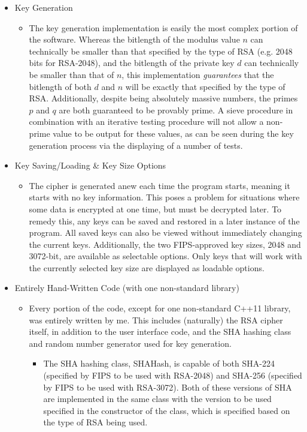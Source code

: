 \documentclass[11pt]{article}
\begin{document}
\begin{itemize}
{\begin{itemize}
{Signing with CRT can be accomplished in the same manner, simply swapping the positions of $m$ and $c$.
	}
	\end{itemize}
}
\item
{Key Generation
	\begin{itemize}
	\item
	{The key generation implementation is easily the most complex portion of the software. Whereas the bitlength of the modulus value $n$ can technically be smaller than that specified by the type of RSA (e.g. 2048 bits for RSA-2048), and the bitlength of the private key $d$ can technically be smaller than that of $n$, this implementation \textit{guarantees} that the bitlength of both $d$ and $n$ will be exactly that specified by the type of RSA. Additionally, despite being absolutely massive numbers, the primes $p$ and $q$ are both guaranteed to be provably prime. A sieve procedure in combination with an iterative testing procedure will not allow a non-prime value to be output for these values, as can be seen during the key generation process via the displaying of a number of tests.
	}
	\end{itemize}
}
\item
{Key Saving/Loading \& Key Size Options
	\begin{itemize}
	\item
	{The cipher is generated anew each time the program starts, meaning it starts with no key information. This poses a problem for situations where some data is encrypted at one time, but must be decrypted later. To remedy this, any keys can be saved and restored in a later instance of the program. All saved keys can also be viewed without immediately changing the current keys. Additionally, the two FIPS-approved key sizes, 2048 and 3072-bit, are available as selectable options. Only keys that will work with the currently selected key size are displayed as loadable options.
	}
	\end{itemize}
}
\item
{Entirely Hand-Written Code (with one non-standard library)
	\begin{itemize}
	\item
	{Every portion of the code, except for one non-standard C++11 library, was entirely written by me. This includes (naturally) the RSA cipher itself, in addition to the user interface code, and the SHA hashing class and random number generator used for key generation.
		\begin{itemize}
		\item
		{The SHA hashing class, SHAHash, is capable of both SHA-224 (specified by FIPS to be used with RSA-2048) and SHA-256 (specified by FIPS to be used with RSA-3072). Both of these versions of SHA are implemented in the same class with the version to be used specified in the constructor of the class, which is specified based on the type of RSA being used.
}
\end{itemize}}
\end{itemize}}
\end{itemize}
\end{document}
